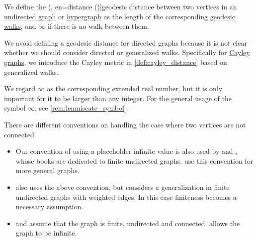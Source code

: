\begin{definition}\label{def:graph_geodesic_distance}
  We define the \term[ru=расстояние (\cite[34]{ЕмеличевИПр1990ТеорияГрафов}), en=distance (\cite[def. 1.1.5]{Knauer2019AlgebraicGraphTheory})]{geodesic distance} between two vertices in an \hyperref[def:undirected_graph]{undirected graph} or \hyperref[def:hypergraph]{hypergraph} as the length of the corresponding \hyperref[def:graph_geodesic]{geodesic walks}, and \( \infty \) if there is no walk between them.
\end{definition}
\begin{comments}
  \item We avoid defining a geodesic distance for directed graphs because it is not clear whether we should consider directed or generalized walks. Specifically for \hyperref[def:cayley_graph]{Cayley graphs}, we introduce the Cayley metric in \cref{def:cayley_distance} based on generalized walks.

  \item We regard \( \infty \) as the corresponding \hyperref[def:extended_real_numbers]{extended real number}, but it is only important for it to be larger than any integer. For the general usage of the symbol \( \infty \), see \cref{rem:lemniscate_symbol}.

  \item There are different conventions on handling the case where two vertices are not connected.
  \begin{itemize}
    \item Our convention of using a placeholder infinite value is also used by  and , whose books are dedicated to finite undirected graphs.  use this convention for more general graphs.

    \item {} also uses the above convention, but considers a generalization in finite undirected graphs with weighted edges. In this case finiteness becomes a necessary assumption.

    \item {} and  assume that the graph is finite, undirected and connected.  allows the graph to be infinite.
  \end{itemize}
\end{comments}

